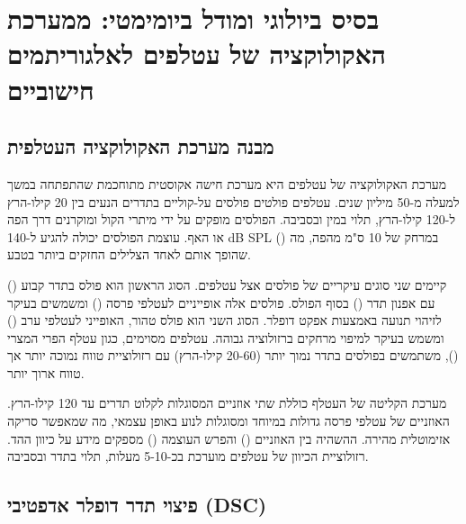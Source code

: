 

\section{בסיס ביולוגי ומודל ביומימטי: ממערכת האקולוקציה של עטלפים לאלגוריתמים חישוביים}
\label{sec:ch02_bio_basis}

\subsection{מבנה מערכת האקולוקציה העטלפית}
\label{sec:ch02_echolocation_structure}

מערכת האקולוקציה של עטלפים היא מערכת חישה אקוסטית מתוחכמת שהתפתחה במשך למעלה מ-50 מיליון שנים. עטלפים פולטים פולסים על-קוליים בתדרים הנעים בין 20 קילו-הרץ ל-120 קילו-הרץ, תלוי במין ובסביבה. הפולסים מופקים על ידי מיתרי הקול ומוקרנים דרך הפה או האף. עוצמת הפולסים יכולה להגיע ל-140 dB SPL () במרחק של 10 ס"מ מהפה, מה שהופך אותם לאחד הצלילים החזקים ביותר בטבע. \cite{GriffinBatEcholocation}

קיימים שני סוגים עיקריים של פולסים אצל עטלפים. הסוג הראשון הוא פולס בתדר קבוע () עם אפנון תדר () בסוף הפולס. פולסים אלה אופייניים לעטלפי פרסה () ומשמשים בעיקר לזיהוי תנועה באמצעות אפקט דופלר. הסוג השני הוא פולס  טהור, האופייני לעטלפי ערב () ומשמש בעיקר למיפוי מרחקים ברזולוציה גבוהה. עטלפים מסוימים, כגון עטלף הפרי המצרי (), משתמשים בפולסים בתדר נמוך יותר (20-60 קילו-הרץ) עם רזולוציית טווח נמוכה יותר אך טווח ארוך יותר. \cite{Simmons1979BatSonar}

מערכת הקליטה של העטלף כוללת שתי אוזניים המסוגלות לקלוט תדרים עד 120 קילו-הרץ. האוזניים של עטלפי פרסה גדולות במיוחד ומסוגלות לנוע באופן עצמאי, מה שמאפשר סריקה אזימוטלית מהירה. ההשהיה בין האוזניים () והפרש העוצמה () מספקים מידע על כיוון ההד. רזולוציית הכיוון של עטלפים מוערכת בכ-5-10 מעלות, תלוי בתדר ובסביבה. \cite{MossEcholocation}

\subsection{פיצוי תדר דופלר אדפטיבי (DSC)}
\label{sec:ch02_dsc}

